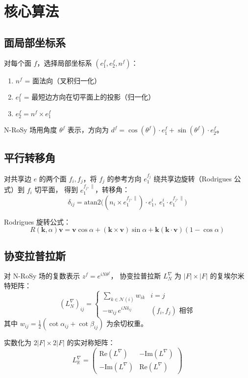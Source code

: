 \documentclass[11pt,a4paper]{article}
\begin{document}
\section{核心算法}

\subsection{面局部坐标系}

对每个面 $f$，选择局部坐标系 $(e_1^f, e_2^f, n^f)$：
\begin{enumerate}
  \item $n^f$ = 面法向（叉积归一化）
  \item $e_1^f$ = 最短边方向在切平面上的投影（归一化）
  \item $e_2^f = n^f \times e_1^f$
\end{enumerate}

N-RoSy 场用角度 $\theta^f$ 表示，方向为
$d^f = \cos(\theta^f) \cdot e_1^f + \sin(\theta^f) \cdot e_2^f$。

\subsection{平行转移角}

对共享边 $e$ 的两个面 $f_i, f_j$，将 $f_j$ 的参考方向
$e_1^{f_j}$ 绕共享边旋转（Rodrigues 公式）到 $f_i$ 切平面，
得到 $e_1^{f_j,\parallel}$，转移角：
\[
  \delta_{ij} = \text{atan2}\!\big(
    (n_i \times e_1^{f_j,\parallel}) \cdot e_1^i,\;
    e_1^i \cdot e_1^{f_j,\parallel}
  \big)
\]

Rodrigues 旋转公式：
\[
  R(\mathbf{k}, \alpha)\mathbf{v} =
  \mathbf{v}\cos\alpha + (\mathbf{k} \times \mathbf{v})\sin\alpha
  + \mathbf{k}(\mathbf{k} \cdot \mathbf{v})(1 - \cos\alpha)
\]

\subsection{协变拉普拉斯}

对 N-RoSy 场的复数表示 $z^f = e^{iN\theta^f}$，
协变拉普拉斯 $L^\nabla_N$ 为 $|F| \times |F|$ 的复埃尔米特矩阵：
\[
  (L^\nabla_N)_{ij} = \begin{cases}
    \displaystyle\sum_{k \in \mathcal{N}(i)} w_{ik} & i = j \\
    -w_{ij} \, e^{iN\delta_{ij}} & (f_i, f_j) \text{ 相邻}
  \end{cases}
\]
其中 $w_{ij} = \frac{1}{2}(\cot\alpha_{ij} + \cot\beta_{ij})$ 为余切权重。

实数化为 $2|F| \times 2|F|$ 的实对称矩阵：
\[
  L^\nabla_{\mathbb{R}} = \begin{pmatrix}
    \text{Re}(L^\nabla) & -\text{Im}(L^\nabla) \\
    -\text{Im}(L^\nabla) & \text{Re}(L^\nabla)
  \end{pmatrix}
\]
\end{document}
